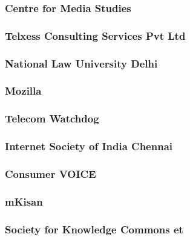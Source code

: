 \documentclass{article}
\begin{document}
\subsubsection{Centre for Media Studies}


\subsubsection{Telxess Consulting Services Pvt Ltd}


\subsubsection{National Law University Delhi}


\subsubsection{Mozilla}


\subsubsection{Telecom Watchdog}


\subsubsection{Internet Society of India Chennai}


\subsubsection{Consumer VOICE}


\subsubsection{mKisan}


\subsubsection{Society for Knowledge Commons et}

\end{document}
